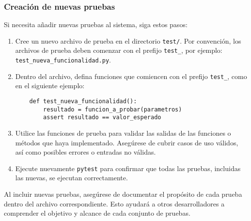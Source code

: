\subsubsection{Creación de nuevas pruebas}

Si necesita añadir nuevas pruebas al sistema, siga estos pasos:
\begin{enumerate}
    \item Cree un nuevo archivo de prueba en el directorio \texttt{test/}. Por convención, los archivos de prueba deben comenzar con el prefijo \texttt{test\_}, por ejemplo: \texttt{test\_nueva\_funcionalidad.py}.
    \item Dentro del archivo, defina funciones que comiencen con el prefijo \texttt{test\_}, como en el siguiente ejemplo:
    \begin{verbatim}
    def test_nueva_funcionalidad():
        resultado = funcion_a_probar(parametros)
        assert resultado == valor_esperado
    \end{verbatim}
    \item Utilice las funciones de prueba para validar las salidas de las funciones o métodos que haya implementado. Asegúrese de cubrir casos de uso válidos, así como posibles errores o entradas no válidas.
    \item Ejecute nuevamente \texttt{pytest} para confirmar que todas las pruebas, incluidas las nuevas, se ejecutan correctamente.
\end{enumerate}

Al incluir nuevas pruebas, asegúrese de documentar el propósito de cada prueba dentro del archivo correspondiente. Esto ayudará a otros desarrolladores a comprender el objetivo y alcance de cada conjunto de pruebas.



